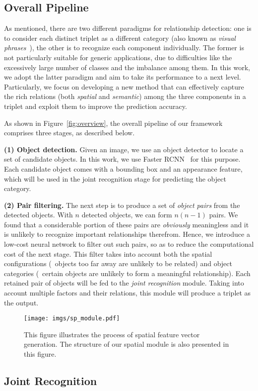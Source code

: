 \documentclass[10pt,twocolumn,letterpaper]{article}
\begin{document}
\subsection{Overall Pipeline}

As mentioned, there are two different paradigms for relationship detection:
one is to consider each distinct triplet as a different category 
(also known as \emph{visual phrases}~\cite{sadeghi2011recognition}), 
the other is to recognize each component individually.
The former is not particularly suitable for generic applications,   
due to difficulties like the excessively large number of classes and 
the imbalance among them.
In this work, we adopt the latter paradigm and aim to take its 
performance to a next level.
Particularly, we focus on developing a new method that can effectively 
capture the rich relations (both \emph{spatial} and \emph{semantic}) 
among the three components in a triplet 
and exploit them to improve the prediction accuracy.

As shown in Figure~\ref{fig:overview}, 
the overall pipeline of our framework comprises three stages, 
as described below.

\textbf{(1) Object detection.} 
Given an image, we use an object detector to locate a set of candidate objects.
In this work, we use Faster RCNN~\cite{ren2015fasterrcnn} for this purpose.
Each candidate object comes with a bounding box and 
an appearance feature,
which will be used in the joint recognition stage for
predicting the object category.

\textbf{(2) Pair filtering.}
The next step is to produce a set of \emph{object pairs} from the detected
objects. With $n$ detected objects, we can form $n (n - 1)$ pairs.
We found that a considerable portion of these pairs are \emph{obviously} 
meaningless and it is unlikely to recognize important relationships therefrom.
Hence, we introduce a low-cost neural network to filter out such pairs,
so as to reduce the computational cost of the next stage. 
This filter takes into account both the spatial configurations 
(\eg~objects too far away are unlikely to be related)
and object categories 
(\eg~certain objects are unlikely to form a meaningful relationship). 
Each retained pair of objects will be fed to the \emph{joint recognition}
module. 
Taking into account multiple factors and their relations,
this module will produce a triplet as the output.

\begin{figure}
    \centering
    \texttt{[image: imgs/sp\_module.pdf]}
    \caption{\small This figure illustrates the process of spatial feature vector generation. 
		The structure of our spatial module is also presented in this figure.}
    \label{fig:sp_module}
\end{figure}\subsection{Joint Recognition}
\end{document}
